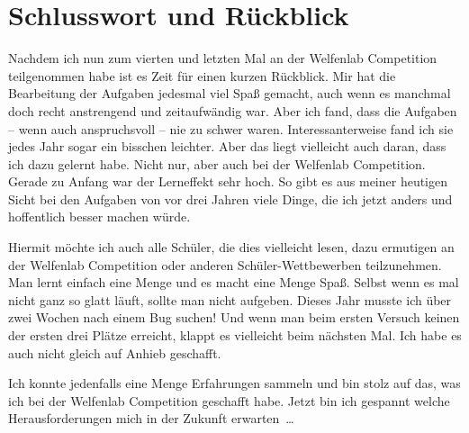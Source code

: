 \chapter{Schlusswort und Rückblick}
Nachdem ich nun zum vierten und letzten Mal an der Welfenlab Competition teilgenommen habe ist es Zeit für einen kurzen Rückblick. Mir hat die Bearbeitung der Aufgaben jedesmal viel Spaß gemacht, auch wenn es manchmal doch recht anstrengend und zeitaufwändig war. Aber ich fand, dass die Aufgaben -- wenn auch anspruchsvoll -- nie zu schwer waren. Interessanterweise fand ich sie jedes Jahr sogar ein bisschen leichter. Aber das liegt vielleicht auch daran, dass ich dazu gelernt habe. Nicht nur, aber auch bei der Welfenlab Competition. Gerade zu Anfang war der Lerneffekt sehr hoch. So gibt es aus meiner heutigen Sicht bei den Aufgaben von vor drei Jahren viele Dinge, die ich jetzt anders und hoffentlich besser machen würde.

Hiermit möchte ich auch alle Schüler, die dies vielleicht lesen, dazu ermutigen an der Welfenlab Competition oder anderen Schüler-Wettbewerben teilzunehmen. Man lernt einfach eine Menge und es macht eine Menge Spaß. Selbst wenn es mal nicht ganz so glatt läuft, sollte man nicht aufgeben. Dieses Jahr musste ich über zwei Wochen nach einem Bug suchen! Und wenn man beim ersten Versuch keinen der ersten drei Plätze erreicht, klappt es vielleicht beim nächsten Mal. Ich habe es auch nicht gleich auf Anhieb geschafft.

Ich konnte jedenfalls eine Menge Erfahrungen sammeln und bin stolz auf das, was ich bei der Welfenlab Competition geschafft habe. Jetzt bin ich gespannt welche Herausforderungen mich in der Zukunft erwarten~\dots
